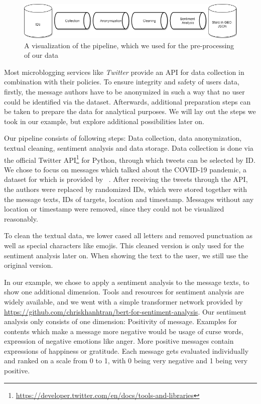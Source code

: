 \begin{figure}
  \includegraphics[width=\linewidth]{figures/data pipeline.png}
  \caption{A visualization of the pipeline, which we used for the pre-processing of our data}
  \label{fig:viz2}
\end{figure}
\label{data_prep}

Most microblogging services like \emph{Twitter} provide an API for data collection in combination with their policies.
To ensure integrity and safety of users data, firstly, the message authors have to be anonymized in such a way that no user could be identified via the dataset. Afterwards, additional preparation steps can be taken to prepare the data for analytical purposes. We will lay out the steps we took in our example, but explore additional possibilities later on. 

Our pipeline consists of following steps: Data collection, data anonymization, textual cleaning, sentiment analysis and data storage.
Data collection is done via the official Twitter API\footnote{\url{https://developer.twitter.com/en/docs/tools-and-libraries}} for Python, through which tweets can be selected by ID. We chose to focus on messages which talked about the COVID-19 pandemic, a dataset for which is provided by ~\cite{DVN/LW0BTB_2020}. After receiving the tweets through the API, the authors were replaced by randomized IDs, which were stored together with the message texts, IDs of targets, location and timestamp. Messages without any location or timestamp were removed, since they could not be visualized reasonably. 

To clean the textual data, we lower cased all letters and removed punctuation as well as special characters like emojis. This cleaned version is only used for the sentiment analysis later on. When showing the text to the user, we still use the original version. 

In our example, we chose to apply a sentiment analysis to the message texts, to show one additional dimension. Tools and resources for sentiment analysis are widely available, and we went with a simple transformer network provided by \url{https://github.com/chriskhanhtran/bert-for-sentiment-analysis}. Our sentiment analysis only consists of one dimension: Positivity of message. Examples for contents which make a message more negative would be usage of curse words, expression of negative emotions like anger. More positive messages contain expressions of happiness or gratitude. Each message gets evaluated individually and ranked on a scale from 0 to 1, with 0 being very negative and 1 being very positive. 

